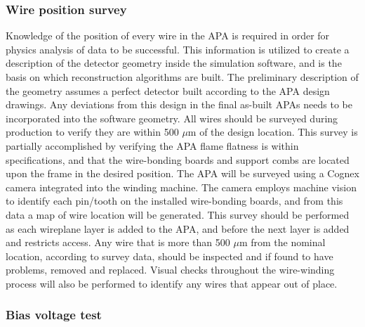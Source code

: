 \subsubsection{Wire position survey}

Knowledge of the position of every wire in the APA is required in order for physics analysis of data to be successful.  This information is utilized to create a description of the detector geometry inside the simulation software, and is the basis on which reconstruction algorithms are built. The preliminary description of the geometry assumes a perfect detector built according to the APA design drawings.  Any deviations from this design in the final as-built APAs needs to be incorporated into the software geometry.  All wires should be surveyed during production to verify they are within 500 $\mu$m of the design location.  This survey is partially accomplished by verifying the APA flame flatness is within specifications, and that the wire-bonding boards and support combs are located upon the frame in the desired position.  The APA will be surveyed using a Cognex camera integrated into the winding machine.  The camera employs machine vision to identify each pin/tooth on the installed wire-bonding boards, and from this data a map of wire location will be generated.  This survey should be performed as each wireplane layer is added to the APA, and before the next layer is added and restricts access.  Any wire that is more than 500 $\mu$m from the nominal location, according to survey data, should be inspected and if found to have problems, removed and replaced.  Visual checks throughout the wire-winding process will also be performed to identify any wires that appear out of place.

\subsubsection{Bias voltage test}

